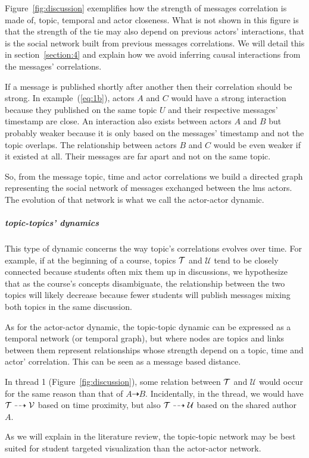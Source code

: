 \documentclass[a4paper,twoside]{article}
\newcommand{\V}{\mathcal{V}}
\newcommand{\U}{\mathcal{U}}
\begin{document}
Figure~\ref{fig:discussion} exemplifies how the strength of messages correlation is made of, topic, temporal and actor closeness.  What is not shown in this figure is that the strength of the tie may also depend on previous actors' interactions, that is the social network built from previous messages correlations.
We will detail this in section~\ref{section:4} and explain how we avoid inferring causal interactions from the messages' correlations.

If a message is published shortly after another then their correlation should be strong.  In example~(\ref{eq:1b}), actors $A$ and $C$ would have a strong interaction because they published on the same topic $U$ and their respective messages' timestamp are close.  An interaction also exists between actors $A$ and $B$ but probably weaker because it is only based on the messages' timestamp and not the topic overlaps.  The relationship between actors $B$ and $C$ would be even weaker if it existed at all.  Their messages are far apart and not on the same topic.  

So, from the message topic, time and actor correlations we build a directed graph representing the social network of messages exchanged between the \gls{lms} actors.  The evolution of that network is what we call the actor-actor dynamic.

\subparagraph{topic-topics' dynamics} This type of dynamic concerns the way topic's correlations evolves over time.  For example, if at the beginning of a course, topics $\mathcal{T}$ and $\U$ tend to be closely connected because students often mix them up in discussions, we hypothesize that as the course's concepts disambiguate, the relationship between the two topics will likely decrease because fewer students will publish messages mixing both topics in the same discussion.

As for the actor-actor dynamic, the topic-topic dynamic can be expressed as a temporal network (or temporal graph), but where nodes are topics and links between them represent relationships whose strength depend on a topic, time and actor' correlation.  This can be seen as a message based distance.

In thread 1 (Figure~\ref{fig:discussion}), some relation between $\mathcal{T}$ and $\U$ would occur for the same reason than that of $A \dashrightarrow B$.  Incidentally, in the  thread, we would have $\T \dashrightarrow \V$ based on time proximity, but also $\T \dashrightarrow \U$ based on the shared author $A$.

As we will explain in the literature review, the topic-topic network may be best suited for student targeted visualization than the actor-actor network.
\end{document}
